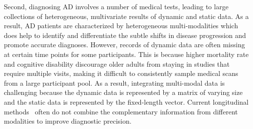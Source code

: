 
Second, diagnosing AD involves a number of medical tests, leading to large collections of heterogeneous, multivariate results of dynamic and static data.
As a result, AD patients are characterized by heterogeneous multi-modalities which does help to identify and differentiate the subtle shifts in disease progression and promote accurate diagnoses. 
However, records of dynamic data are often missing at certain time points for some participants. This is because higher mortality rate and cognitive disability discourage older adults from staying in studies that require multiple visits, making it difficult to consistently sample medical scans from a large participant pool.
As a result, integrating multi-modal data is challenging because the dynamic data is represented by a matrix of varying size and the static data is represented by the fixed-length vector. Current longitudinal methods~\cite{wang2016prediction,langkvist2014review,srivastava2015unsupervised} often do not combine the complementary information from different modalities to improve diagnostic precision.

